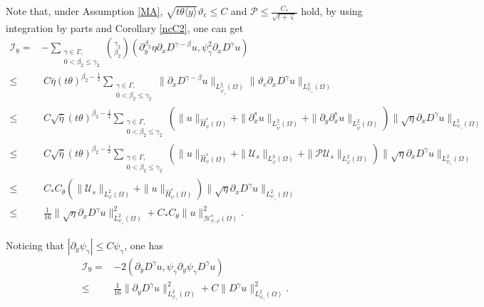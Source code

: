 \documentclass{amsart}
\numberwithin{equation}{section}
\newcommand\y{{{\langle y \rangle}}}
\begin{document}
 Note that, under Assumption \ref{MA}, $\sqrt{t\theta\y}\vartheta_{c}\leq C$ and $\mathcal{P}\leq\frac{C_{*}}{\sqrt{t+\bar{\varsigma}}}$ hold, by using integration by parts and Corollary \ref{ncC2}, one can get
\begin{align*}
\mathcal{I}_{8}
=&-\sum_{\substack{\gamma\in\Gamma,\\0<\beta_{2}\leq\gamma_{2}}}\binom{\gamma_{2}}{\beta_{2}}(\partial_{y}^{\beta_{2}}\eta\partial_{x}D^{\gamma-\beta}u,\psi_{\gamma}^{2}\partial_{x}D^{\gamma}u)\\
\leq&~C\bar{\eta}(t\theta)^{\beta_{2}-\frac{1}{2}}\sum_{\substack{\gamma\in\Gamma,\\0<\beta_{2}\leq\gamma_{2}}}
       \|\partial_{x}D^{\gamma-\beta}u\|_{L_{\hat{\psi}_{\gamma}}^{2}(\Omega)}
       \|\vartheta_{c}\partial_{x}D^{\gamma}u\|_{L_{\psi_{\gamma}}^{2}(\Omega)}\\
\leq&~C\sqrt{\bar{\eta}}(t\theta)^{\beta_{2}-\frac{1}{2}}\sum_{\substack{\gamma\in\Gamma,\\0<\beta_{2}\leq\gamma_{2}}}
       \left(\|u\|_{\hat{H}_{\psi}^{s}(\Omega)}
        +\|\partial_{x}^{s}u\|_{L_{\hat{\psi}}^{2}(\Omega)}
        +\|\partial_{y}\partial_{x}^{s}u\|_{L_{\hat{\psi}}^{2}(\Omega)}\right)
         \|\sqrt{\eta}\partial_{x}D^{\gamma}u\|_{L_{\psi_{\gamma}}^{2}(\Omega)}\\
\leq&~C\sqrt{\bar{\eta}}(t\theta)^{\beta_{2}-\frac{1}{2}}\sum_{\substack{\gamma\in\Gamma,\\0<\beta_{2}\leq\gamma_{2}}}
       \left(\|u\|_{\hat{H}_{\psi}^{s}(\Omega)}
        +\|\mathcal{U}_{s}\|_{L_{\varphi}^{2}(\Omega)}
        +\|\mathcal{P}\mathcal{U}_{s}\|_{L_{\varphi}^{2}(\Omega)}\right)
       \|\sqrt{\eta}\partial_{x}D^{\gamma}u\|_{L_{\psi_{\gamma}}^{2}(\Omega)}\\
\leq&~C_{*}C_{\theta}\left(\|\mathcal{U}_{s}\|_{L_{\varphi}^{2}(\Omega)}+\|u\|_{\hat{H}_{\psi}^{s}(\Omega)}\right)
       \|\sqrt{\eta}\partial_{x}D^{\gamma}u\|_{L_{\psi_{\gamma}}^{2}(\Omega)}\\
\leq&~\frac{1}{16}\|\sqrt{\eta}\partial_{x}D^{\gamma}u\|_{L_{\psi_{\gamma}}^{2}(\Omega)}^{2}
     +C_{*}C_{\theta}\|u\|_{\mathcal{H}_{\psi,\varphi}^{s}(\Omega)}^{2}.
\end{align*}


 Noticing that $|\partial_{y}\psi_{\gamma}|\leq C\psi_{\gamma}$, one has
\begin{align*}
\mathcal{I}_{9}
=&-2(\partial_{y}D^{\gamma}u,\psi_{\gamma}\partial_{y}\psi_{\gamma}D^{\gamma}u)\\
\leq& \frac{1}{16}\|\partial_{y}D^{\gamma}u\|_{L_{\psi_{\gamma}}^{2}(\Omega)}^{2}
     +C\|D^{\gamma}u\|_{L_{\psi_{\gamma}}^{2}(\Omega)}^{2}.
\end{align*}
\end{document}
